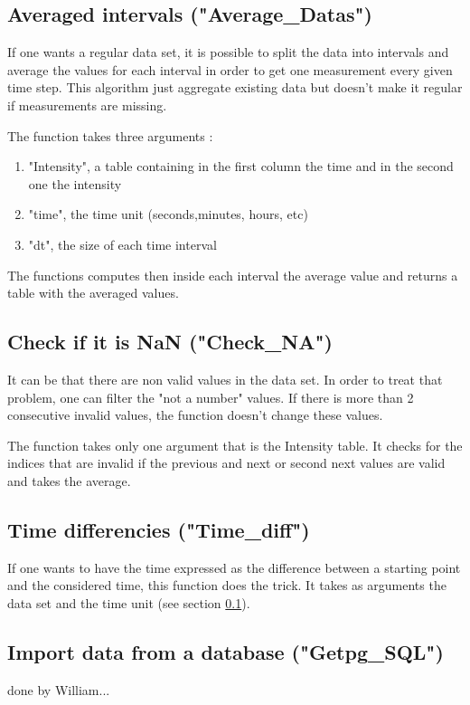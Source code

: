 \documentclass[a4wide,12pt]{article}
\begin{document}
\subsection{Averaged intervals ("Average\_Datas")}
\label{average_date}
If one wants a regular data set, it is possible to split the data into intervals and average the values for each interval in order to get one measurement every given time step. This algorithm just aggregate existing data but doesn't make it regular if measurements are missing. 

The function takes three arguments : 

\begin{enumerate}
\item "Intensity", a table containing in the first column the time and in the second one the intensity
\item "time", the time unit (seconds,minutes, hours, etc)
\item "dt", the size of each time interval
\end{enumerate} 

The functions computes then inside each interval the average value and returns a table with the averaged values.

\subsection{Check if it is NaN ("Check\_NA")}
It can be that there are non valid values in the data set. In order to treat that problem, one can filter the "not a number" values. If there is more than 2 consecutive invalid values, the function doesn't change these values. 

The function takes only one argument that is the Intensity table. It checks for the indices that are invalid if the previous and next or second next values are valid and takes the average.

\subsection{Time differencies ("Time\_diff")}
If one wants to have the time expressed as the difference between a starting point and the considered time, this function does the trick. It takes as arguments the data set and the time unit (see section \ref{average_date}). 

\subsection{Import data from a database ("Getpg\_SQL")}
done by William...
\end{document}
